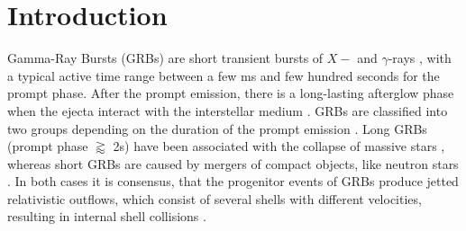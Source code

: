\documentclass[twocolumn,traditabstract]{aa}
\begin{document}


\maketitle

\section{Introduction}

Gamma-Ray Bursts (GRBs) are short transient bursts of $X-$ and $\gamma$-rays \citep{Klebesadel+1973}, with a typical active time range between a few ms and few hundred seconds for the prompt phase.
After the prompt emission, there is a long-lasting afterglow phase when the ejecta interact with the interstellar medium \citep{MeszarosRees1997, afterglow}. GRBs are classified into two groups depending on the duration of the prompt emission \citep{shortlong}. Long GRBs (prompt phase $\gtrapprox$ 2s) have been associated with the collapse of massive stars \citep{SN1, Hjorth+2003, SN2}, whereas short GRBs are  caused by mergers of compact objects, like neutron stars \citep{Eichler+1989, gw}. In both cases it is consensus, that the progenitor events of GRBs produce jetted relativistic outflows, which consist of several shells with different velocities, resulting in internal shell collisions \citep{ReesMeszaros1994, Mochkovitch+1995}.
\end{document}
